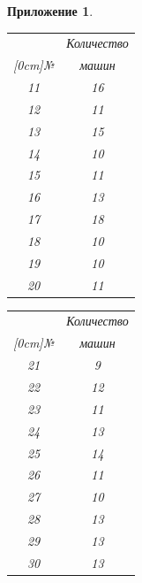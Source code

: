 \documentclass[12pt, a4paper]{extarticle}
\numberwithin{equation}{section}
\newtheorem{attachment}{\hspace{12cm}  Приложение}
\numberwithin{figure}{section}
\begin{document}
\begin{attachment}
\begin{table}[h!]
\begin{minipage}{0.23\linewidth}
		\begin{tabular}{|c|c|}
			\hline
			& Количество \\ 
			\raisebox{1.5ex}[0cm]{№}
			& машин  
			\\\hline
			11 & 16
			\\\hline
			12 & 11
			\\\hline
			13 & 15
			\\\hline
			14 & 10
			\\\hline
			15 & 11
			\\\hline
			16 & 13
			\\\hline
			17 & 18
			\\\hline
			18 & 10
			\\\hline
			19 & 10
			\\\hline
			20 & 11
			\\\hline
		\end{tabular}
	\end{minipage} 
	\begin{minipage}{0.23\linewidth}
		\centering
		
		\begin{tabular}{|c|c|}
			\hline
			& Количество \\ 
			\raisebox{1.5ex}[0cm]{№}
			& машин 
			\\\hline
			21 & 9
			\\\hline
			22 & 12
			\\\hline
			23 & 11
			\\\hline
			24 & 13
			\\\hline
			25 & 14
			\\\hline
			26 & 11
			\\\hline
			27 & 10
			\\\hline
			28 & 13
			\\\hline
			29 & 13
			\\\hline
			30 & 13
			\\\hline
		\end{tabular}
	\end{minipage} 
	\begin{minipage}{0.23\linewidth}
		\centering
		

\end{minipage}
\end{table}
\end{attachment}
\end{document}
